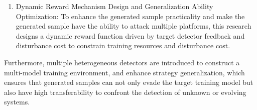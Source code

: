 \begin{enumerate} [label=\arabic*)]
\item Dynamic Reward Mechanism Design and Generalization Ability Optimization: To enhance the generated sample practicality and make the generated sample have the ability to attack multiple platforms, this research designs a dynamic reward function driven by target detector feedback and disturbance cost to constrain training resources and disturbance cost.
\end{enumerate}

Furthermore, multiple heterogeneous detectors are introduced to construct a multi-model training environment, and enhance strategy generalization, which ensures that generated samples can not only evade the target training model but also have high transferability to confront the detection of unknown or evolving systems.



